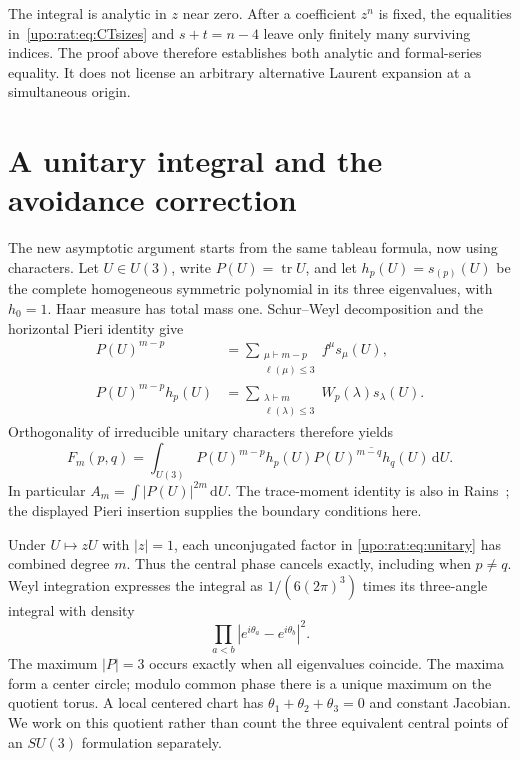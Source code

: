 \documentclass[11pt,letterpaper]{article}
\theoremstyle{remark}\newtheorem{remark}[theorem]{Remark}
\numberwithin{equation}{section}
\newcommand{\tr}{\operatorname{tr}}
\newcommand{\dd}{\,\mathrm d}
\begin{document}
The integral is analytic in $z$ near zero. After a coefficient $z^n$ is
fixed, the equalities in~\eqref{upo:rat:eq:CTsizes} and $s+t=n-4$ leave only
finitely many surviving indices. The proof above therefore establishes
both analytic and formal-series equality. It does not license an
arbitrary alternative Laurent expansion at a simultaneous origin.

\section{A unitary integral and the avoidance correction}\label{upo:rat:sec:unitary}
The new asymptotic argument starts from the same tableau formula, now
using characters. Let $U\in U(3)$, write $P(U)=\tr U$, and let
$h_p(U)=s_{(p)}(U)$ be the complete homogeneous symmetric polynomial in
its three eigenvalues, with $h_0=1$. Haar measure has total mass one.
Schur--Weyl decomposition and the horizontal Pieri identity give
\begin{align*}
P(U)^{m-p}&=\sum_{\substack{\mu\vdash m-p\\\ell(\mu)\le3}}
 f^\mu s_\mu(U),\\
P(U)^{m-p}h_p(U)&=\sum_{\substack{\lambda\vdash m\\\ell(\lambda)\le3}}
 W_p(\lambda)s_\lambda(U).
\end{align*}
Orthogonality of irreducible unitary characters therefore yields
\begin{equation}\label{upo:rat:eq:unitary}
F_m(p,q)=\int_{U(3)}P(U)^{m-p}h_p(U)
\overline{P(U)^{m-q}h_q(U)}\dd U.
\end{equation}
In particular $A_m=\int|P(U)|^{2m}\dd U$.
The trace-moment identity is also in Rains~\cite{Rains}; the displayed
Pieri insertion supplies the boundary conditions here.

Under $U\mapsto zU$ with $|z|=1$, each unconjugated factor in
\eqref{upo:rat:eq:unitary} has combined degree $m$. Thus the central phase cancels
exactly, including when $p\ne q$. Weyl integration expresses the integral
as $1/(6(2\pi)^3)$ times its three-angle integral with density
\[
\prod_{a<b}|e^{i\theta_a}-e^{i\theta_b}|^2.
\]
The maximum $|P|=3$ occurs exactly when all eigenvalues coincide. The
maxima form a center circle; modulo common phase there is a unique
maximum on the quotient torus. A local centered chart has
$\theta_1+\theta_2+\theta_3=0$ and constant Jacobian. We work on this
quotient rather than count the three equivalent central points of an
$SU(3)$ formulation separately.
\end{document}
